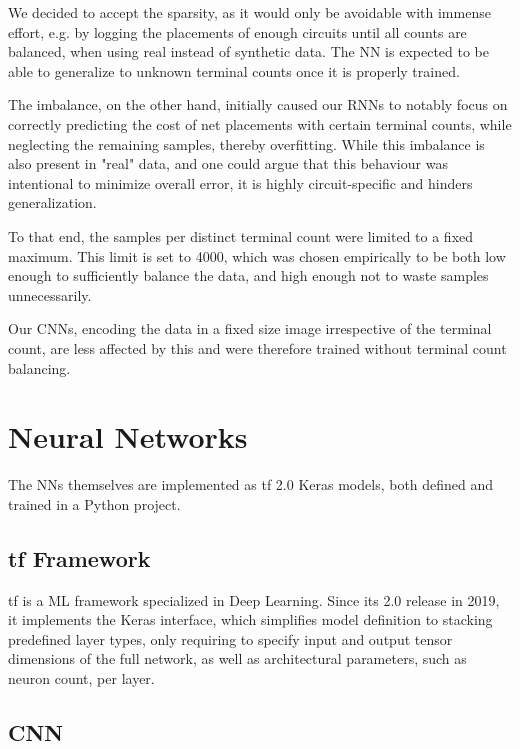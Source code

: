 We decided to accept the sparsity, as it would only be avoidable with immense effort, e.g. by logging the placements of enough circuits until all counts are balanced, when using real instead of synthetic data. The \gls{NN} is expected to be able to generalize to unknown terminal counts once it is properly trained.

The imbalance, on the other hand, initially caused our \glspl{RNN} to notably focus on correctly predicting the cost of net placements with certain terminal counts, while neglecting the remaining samples, thereby overfitting. While this imbalance is also present in "real" data, and one could argue that this behaviour was intentional to minimize overall error, it is highly circuit-specific and hinders generalization.

To that end, the samples per distinct terminal count were limited to a fixed maximum. This limit is set to 4000, which was chosen empirically to be both low enough to sufficiently balance the data, and high enough not to waste samples unnecessarily.

Our \glspl{CNN}, encoding the data in a fixed size image irrespective of the terminal count, are less affected by this and were therefore trained without terminal count balancing.

\section{Neural Networks}

The \glspl{NN} themselves are implemented as \gls{tf} 2.0 Keras models, both defined and trained in a Python project.

\subsection{\gls{tf} Framework}

\gls{tf} is a \gls{ML} framework specialized in Deep Learning\cite{tensorflow2015-whitepaper}. Since its 2.0 release in 2019, it implements the Keras interface\cite{chollet2015keras}, which simplifies model definition to stacking predefined layer types, only requiring to specify input and output tensor dimensions of the full network, as well as architectural parameters, such as neuron count, per layer.

\subsection{\gls{CNN}}

